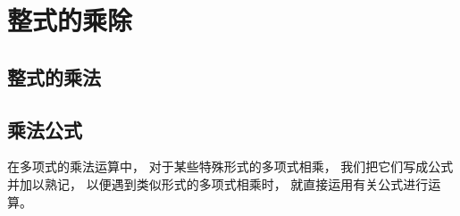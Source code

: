 \chapter{整式的乘除}

\section{整式的乘法}\label{sec:6-1}









\section{乘法公式}\label{sec:6-2}

在多项式的乘法运算中， 对于某些特殊形式的多项式相乘， 我们把它们写成公式并加以熟记，
以便遇到类似形式的多项式相乘时， 就直接运用有关公式进行运算。






